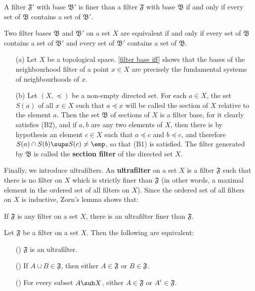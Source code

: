 \begin{corollary}\label{filter finer iff base finer}
A filter $\mathfrak{F}'$ with base $\mathfrak{B}'$ is finer than a filter $\mathfrak{F}$ with base $\mathfrak{B}$ if and only if every set of $\mathfrak{B}$ contains a set of $\mathfrak{B}'$.
\end{corollary}
\begin{corollary}
Two filter bases $\mathfrak{B}$ and $\mathfrak{B}'$ on a set $X$ are equivalent if and only if every set of $\mathfrak{B}$ contains a set of $\mathfrak{B}'$ and every set of $\mathfrak{B}'$ contains a set of $\mathfrak{B}$.
\end{corollary}
\begin{example}
\mbox{}
\begin{itemize}
\item[(a)] Let $X$ be a topological space. \cref{filter base iff} shows that the bases of the neighbourhood filter of a point $x\in X$ are precisely the fundamental systems of neighbourhoods of $x$.
\item[(b)] Let $(X,\preceq)$ be a non-empty directed set. For each $a\in X$, the set $S(a)$ of all $x\in X$ such that $a\preceq x$ will be called the section of $X$ relative to the element $a$. Then the set $\mathfrak{B}$ of sections of $X$ is a filter base, for it clearly satisfies (B2), and if $a,b$ are any two elements of $X$, then there is by hypothesis an element $c\in X$ such that $a\preceq c$ and $b\preceq c$, and therefore $S(a)\cap S(b)\sups S(c)\neq\emp$, so that (B1) is satisfied. The filter generated by $\mathfrak{B}$ is called the \textbf{section filter} of the directed set $X$. 
\end{itemize}
\end{example}
Finally, we introduce ultrafilters. An \textbf{ultrafilter} on a set $X$ is a filter $\mathfrak{F}$ such that there is no filter on $X$ which is strictly finer than $\mathfrak{F}$ (in other words, a maximal element in the ordered set of all filters on $X$). Since the ordered set of all filters on $X$ is inductive, Zorn's lemma shows that:
\begin{proposition}
If $\mathfrak{F}$ is any filter on a set $X$, there is an ultrafilter finer than $\mathfrak{F}$.
\end{proposition}
\begin{theorem}\label{ultrafilter char}
Let $\mathfrak{F}$ be a filter on a set $X$. Then the following are equivalent:
\begin{itemize}
\item[(\rmnum{1})] $\mathfrak{F}$ is an ultrafilter.
\item[(\rmnum{2})] If $A\cup B\in\mathfrak{F}$, then either $A\in\mathfrak{F}$ or $B\in\mathfrak{F}$.
\item[(\rmnum{3})] For every subset $A\sub X$, either $A\in\mathfrak{F}$ or $A^c\in\mathfrak{F}$.
\end{itemize}
\end{theorem}
